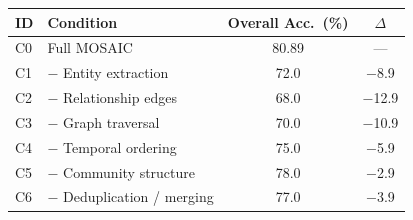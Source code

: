 \begin{tabular}{@{}llcc@{}}
\toprule
\textbf{ID} & \textbf{Condition} & \textbf{Overall Acc.\ (\%)} & $\Delta$ \\
\midrule
C0 & Full MOSAIC & 80.89 & --- \\
C1 & $-$ Entity extraction & 72.0 & $-$8.9 \\
C2 & $-$ Relationship edges & 68.0 & $-$12.9 \\
C3 & $-$ Graph traversal & 70.0 & $-$10.9 \\
C4 & $-$ Temporal ordering & 75.0 & $-$5.9 \\
C5 & $-$ Community structure & 78.0 & $-$2.9 \\
C6 & $-$ Deduplication / merging & 77.0 & $-$3.9 \\
\bottomrule
\end{tabular}